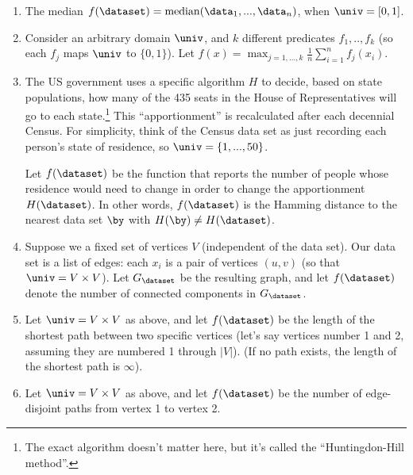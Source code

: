\documentclass[11pt]{article}
\begin{document}
\begin{enumerate}[leftmargin=\parindent, itemsep=3ex]
\begin{enumerate}
    \item The median $f(\dataset) = \mathrm{median}(\data_1,...,\data_n)$, when $\univ=[0,1]$.

     \item Consider an arbitrary domain $\univ$, and $k$ different
       predicates $f_1,..,f_k$ (so each $f_j$ maps $\univ$ to
       $\{0,1\}$). Let $f(x) = \max_{j=1,...,k} \frac 1 n \sum_{i=1}^n f_j(x_i)$.

     \item The US government uses a specific algorithm $H$ to decide,
       based on state populations, how many of the 435 seats in the
       House of Representatives will go to each state.\footnote{The
         exact algorithm doesn't matter here, but it's called the
         ``Huntingdon-Hill method''. } This
       ``apportionment'' is recalculated after each decennial
       Census. For simplicity, think of the Census data set as just
       recording each person's state of residence, so
       $\univ=\{1,...,50\}$.

       Let $f(\dataset)$ be the function that reports the number of people
       whose residence would need to change in order to change the
       apportionment $H(\dataset)$. In other words, $f(\dataset)$ is the Hamming
       distance to the nearest data set $\by$ with $H(\by) \neq H(\dataset)$. 
       
    \item Suppose we a fixed set of vertices $V$
      (independent of the data set). Our data set is a list of edges:
      each $x_i$ is a pair of vertices $(u,v)$ (so that $\univ=V\times
      V$). Let $G_\dataset$ be the resulting graph, and let $f(\dataset)$ denote the
      number of connected components in $G_\dataset$. 

    \item Let $\univ= V\times V$ as above, and let $f(\dataset)$ be the length
      of the shortest path between two specific vertices (let's say
      vertices number 1 and 2, assuming they are numbered 1 through
      $|V|$). (If no path exists, the length of the shortest path is
      $\infty$).

    \item  Let $\univ= V\times V$ as above, and let $f(\dataset)$ be the number
      of edge-disjoint paths from vertex 1 to vertex 2. 
      
    \end{enumerate}
  

  


\end{enumerate}
\end{document}
